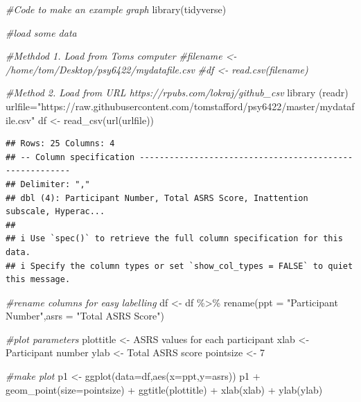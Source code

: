 \documentclass[
]{book}
\newenvironment{Shaded}{\begin{snugshade}}{\end{snugshade}}
\newcommand{\AttributeTok}[1]{\textcolor[rgb]{0.77,0.63,0.00}{#1}}
\newcommand{\CommentTok}[1]{\textcolor[rgb]{0.56,0.35,0.01}{\textit{#1}}}
\newcommand{\DecValTok}[1]{\textcolor[rgb]{0.00,0.00,0.81}{#1}}
\newcommand{\FunctionTok}[1]{\textcolor[rgb]{0.00,0.00,0.00}{#1}}
\newcommand{\NormalTok}[1]{#1}
\newcommand{\OtherTok}[1]{\textcolor[rgb]{0.56,0.35,0.01}{#1}}
\newcommand{\SpecialCharTok}[1]{\textcolor[rgb]{0.00,0.00,0.00}{#1}}
\newcommand{\StringTok}[1]{\textcolor[rgb]{0.31,0.60,0.02}{#1}}
\begin{document}
\begin{Shaded}
\begin{Highlighting}[]
\CommentTok{\#Code to make an example graph}
\FunctionTok{library}\NormalTok{(tidyverse)}

\CommentTok{\#load some data}

\CommentTok{\#Methdod 1. Load from Tom\textquotesingle{}s computer}
\CommentTok{\#filename \textless{}{-} \textquotesingle{}/home/tom/Desktop/psy6422/mydatafile.csv\textquotesingle{}}
\CommentTok{\#df \textless{}{-} read.csv(filename)}

\CommentTok{\#Method 2. Load from URL https://rpubs.com/lokraj/github\_csv}
\FunctionTok{library}\NormalTok{ (readr)}
\NormalTok{urlfile}\OtherTok{=}\StringTok{"https://raw.githubusercontent.com/tomstafford/psy6422/master/mydatafile.csv"}
\NormalTok{df }\OtherTok{\textless{}{-}} \FunctionTok{read\_csv}\NormalTok{(}\FunctionTok{url}\NormalTok{(urlfile))}
\end{Highlighting}
\end{Shaded}

\begin{verbatim}
## Rows: 25 Columns: 4
## -- Column specification --------------------------------------------------------
## Delimiter: ","
## dbl (4): Participant Number, Total ASRS Score, Inattention subscale, Hyperac...
## 
## i Use `spec()` to retrieve the full column specification for this data.
## i Specify the column types or set `show_col_types = FALSE` to quiet this message.
\end{verbatim}

\begin{Shaded}
\begin{Highlighting}[]
\CommentTok{\#rename columns for easy labelling}
\NormalTok{df }\OtherTok{\textless{}{-}}\NormalTok{ df }\SpecialCharTok{\%\textgreater{}\%} \FunctionTok{rename}\NormalTok{(}\AttributeTok{ppt =} \StringTok{"Participant Number"}\NormalTok{,}\AttributeTok{asrs =} \StringTok{"Total ASRS Score"}\NormalTok{)}

\CommentTok{\#plot parameters}
\NormalTok{plottitle  }\OtherTok{\textless{}{-}}  \StringTok{\textquotesingle{}ASRS values for each participant\textquotesingle{}}
\NormalTok{xlab  }\OtherTok{\textless{}{-}}  \StringTok{\textquotesingle{}Participant number\textquotesingle{}}
\NormalTok{ylab  }\OtherTok{\textless{}{-}}  \StringTok{\textquotesingle{}Total ASRS score\textquotesingle{}}
\NormalTok{pointsize  }\OtherTok{\textless{}{-}}  \DecValTok{7}

\CommentTok{\#make plot}
\NormalTok{p1 }\OtherTok{\textless{}{-}} \FunctionTok{ggplot}\NormalTok{(}\AttributeTok{data=}\NormalTok{df,}\FunctionTok{aes}\NormalTok{(}\AttributeTok{x=}\NormalTok{ppt,}\AttributeTok{y=}\NormalTok{asrs))}
\NormalTok{p1 }\SpecialCharTok{+} \FunctionTok{geom\_point}\NormalTok{(}\AttributeTok{size=}\NormalTok{pointsize) }\SpecialCharTok{+}
  \FunctionTok{ggtitle}\NormalTok{(plottitle) }\SpecialCharTok{+}
  \FunctionTok{xlab}\NormalTok{(xlab) }\SpecialCharTok{+}
  \FunctionTok{ylab}\NormalTok{(ylab)}
\end{Highlighting}
\end{Shaded}
\end{document}
